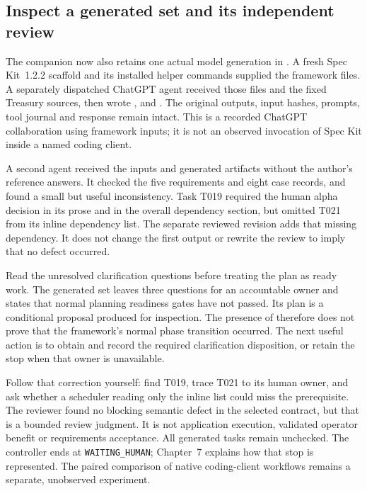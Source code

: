 \subsection{Inspect a generated set and its independent review}

The companion now also retains one actual model generation in . A fresh Spec Kit~1.2.2 scaffold and its installed helper commands supplied the framework files. A separately dispatched ChatGPT agent received those files and the fixed Treasury sources, then wrote ,  and . The original outputs, input hashes, prompts, tool journal and response remain intact. This is a recorded ChatGPT collaboration using framework inputs; it is not an observed invocation of Spec Kit inside a named coding client.

A second agent received the inputs and generated artifacts without the author's reference answers. It checked the five requirements and eight case records, and found a small but useful inconsistency. Task T019 required the human alpha decision in its prose and in the overall dependency section, but omitted T021 from its inline dependency list. The separate reviewed revision adds that missing dependency. It does not change the first output or rewrite the review to imply that no defect occurred.

Read the unresolved clarification questions before treating the plan as ready work. The generated set leaves three questions for an accountable owner and states that normal planning readiness gates have not passed. Its plan is a conditional proposal produced for inspection. The presence of  therefore does not prove that the framework's normal phase transition occurred. The next useful action is to obtain and record the required clarification disposition, or retain the stop when that owner is unavailable.

Follow that correction yourself: find T019, trace T021 to its human owner, and ask whether a scheduler reading only the inline list could miss the prerequisite. The reviewer found no blocking semantic defect in the selected contract, but that is a bounded review judgment. It is not application execution, validated operator benefit or requirements acceptance. All generated tasks remain unchecked. The controller ends at \texttt{WAITING\_HUMAN}; Chapter~7 explains how that stop is represented. The paired comparison of native coding-client workflows remains a separate, unobserved experiment.

